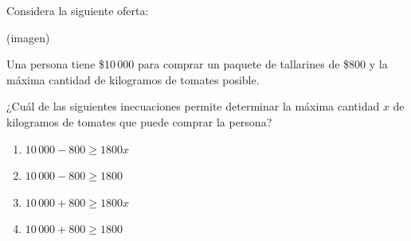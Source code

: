 \begin{problem}
    Considera la siguiente oferta:

    \begin{center}
    (imagen)
    \end{center}

    Una persona tiene \$10\,000 para comprar un paquete de tallarines de \$800 y la máxima cantidad de kilogramos de tomates posible.

    ¿Cuál de las siguientes inecuaciones permite determinar la máxima cantidad $x$ de kilogramos de tomates que puede comprar la persona?

    \begin{enumerate}[label=\Alph*.]
        \item $10\,000 - 800 \geq 1800x$
        \item $10\,000 - 800 \geq 1800$
        \item $10\,000 + 800 \geq 1800x$
        \item $10\,000 + 800 \geq 1800$
    \end{enumerate}
\end{problem}
